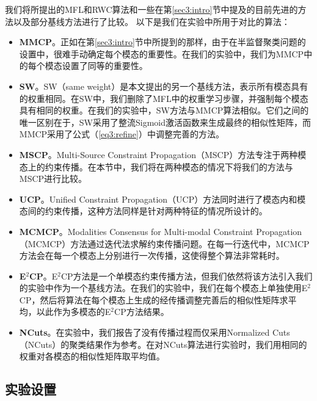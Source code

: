 我们将所提出的MFL和RWC算法和一些在第\ref{sec3:intro}节中提及的目前先进的方法以及部分基线方法进行了比较。
以下是我们在实验中所用于对比的算法：
\begin{itemize}
    \item {\textbf{MMCP}}。正如在第\ref{sec3:intro}节中所提到的那样，由于在半监督聚类问题的设置中，很难手动确定每个模态的重要性。在我们的实验中，我们为MMCP\cite{fu2011multi}中的每个模态设置了同等的重要性。
    \item {\textbf{SW}}。SW（same weight）是本文提出的另一个基线方法，表示所有模态具有的权重相同。在SW中，我们删除了MFL中的权重学习步骤，并强制每个模态具有相同的权重。在我们的实验中，SW方法与MMCP算法相似。它们之间的唯一区别在于，SW采用了整流Sigmoid激活函数来生成最终的相似性矩阵，而MMCP采用了公式（\ref{eq3:refine}）中调整完善的方法。
    \item {\textbf{MSCP}}。Multi-Source Constraint Propagation（MSCP）\cite{lu2013exhaustive}方法专注于两种模态上的约束传播。在本节中，我们将在两种模态的情况下将我们的方法与MSCP进行比较。
    \item {\textbf{UCP}}。Unified Constraint Propagation（UCP）\cite{lu2013unified}方法同时进行了模态内和模态间的约束传播，这种方法同样是针对两种特征的情况所设计的。
    \item {\textbf{MCMCP}}。Modalities Consensus for Multi-modal Constraint Propagation（MCMCP）\cite{fu2012modalities}方法通过迭代法求解约束传播问题。在每一行迭代中，MCMCP方法会在每一个模态上分别进行一次传播，这使得整个算法非常耗时。
    \item {\textbf{E$^2$CP}}。E$^2$CP\cite{lu2010constrained}方法是一个单模态约束传播方法，但我们依然将该方法引入我们的实验中作为一个基线方法。在我们的实验中，我们在每个模态上单独使用E$^2$CP，然后将算法在每个模态上生成的经传播调整完善后的相似性矩阵求平均，以此作为多模态的E$^2$CP方法结果。
    \item {\textbf{NCuts}}。在实验中，我们报告了没有传播过程而仅采用Normalized Cuts（NCuts）\cite{shi2000normalized}的聚类结果作为参考。在对NCuts算法进行实验时，我们用相同的权重对各模态的相似性矩阵取平均值。
\end{itemize}

\subsection{实验设置}

